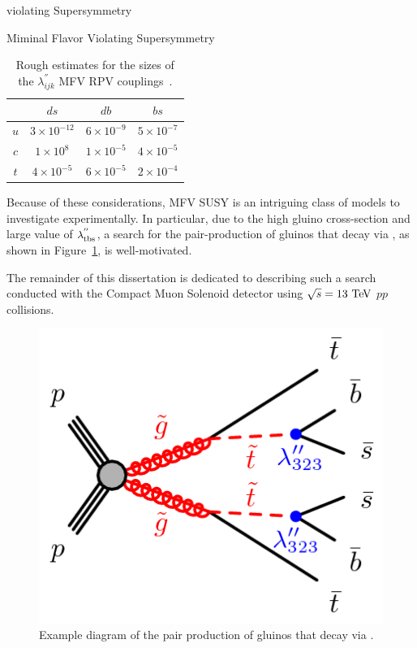 \begin{section}{\RP violating Supersymmetry}
\begin{subsection}{Miminal Flavor Violating Supersymmetry}
\begin{table}[tbp!]
\centering
\begin{tabular}{ |c|ccc| }
\hline
     &  $ds$                 &  $db$                &  $bs$               \\
\hline
$u$  &  $3 \times 10^{-12}$  &  $6 \times 10^{-9}$  &  $5 \times 10^{-7}$ \\
$c$  &  $1 \times 10^{8}$    &  $1 \times 10^{-5}$  &  $4 \times 10^{-5}$ \\
$t$  &  $4 \times 10^{-5}$   &  $6 \times 10^{-5}$  &  $2 \times 10^{-4}$ \\
\hline
\end{tabular}
\caption{Rough estimates for the sizes of the $\lambda^{''}_{ijk}$ MFV RPV couplings~\cite{Csaki:2011ge}.}
\label{tab:mfv_couplings}
\end{table}

Because of these considerations, MFV SUSY is an intriguing class of models to investigate experimentally.
In particular, due to the high gluino cross-section and large value of $\lambda^{''}_{\mathrm{t}\mathrm{b}\mathrm{s}}$, a search for the pair-production of gluinos that decay via \rpvDecay, as shown in Figure~\ref{fig:rpv_decay}, is well-motivated.

The remainder of this dissertation is dedicated to describing such a search conducted with the Compact Muon Solenoid detector using $\sqrt{s} = 13~\mathrm{Te\kern -0.1em V}$ $pp$ collisions.

\begin{figure}[tbp!]
\begin{center}
\includegraphics[angle=0,width=0.40\columnwidth]{fig/rpv_decay.png}
\end{center}
\caption{Example diagram of the pair production of gluinos that decay via \rpvDecay.}
\label{fig:rpv_decay}
\end{figure}

\end{subsection}

\end{section}
